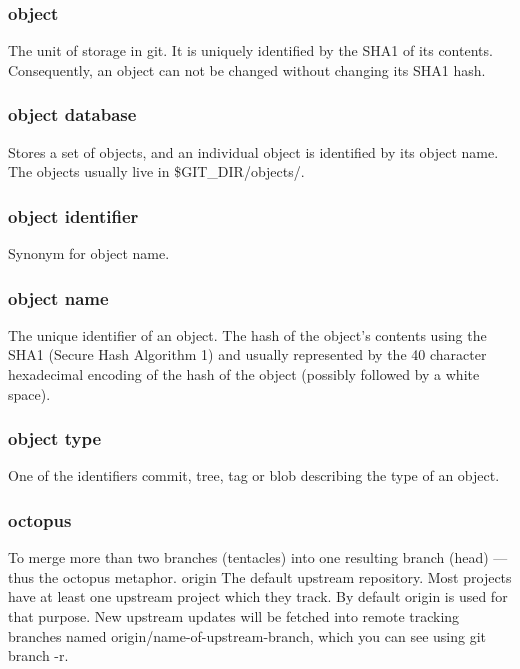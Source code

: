 \subsubsection{object}

The unit of storage in git. It is uniquely identified by the SHA1 of its contents. Consequently, an object can not be changed without changing its SHA1 hash.

\subsubsection{object database}

Stores a set of objects, and an individual object is identified by its object name. The objects usually live in \$GIT\_DIR/objects/.

\subsubsection{object identifier}

Synonym for object name.

\subsubsection{object name}

The unique identifier of an object. The hash of the object's contents using the SHA1 (Secure Hash Algorithm 1) and usually represented by the 40 character hexadecimal encoding of the hash of the object (possibly followed by a white space).

\subsubsection{object type}

One of the identifiers commit, tree, tag or blob describing the type of an object.

\subsubsection{octopus}

To merge more than two branches (tentacles) into one resulting branch (head) — thus the octopus metaphor.
origin
The default upstream repository. Most projects have at least one upstream project which they track. By default origin is used for that purpose. New upstream updates will be fetched into remote tracking branches named origin/name-of-upstream-branch, which you can see using git branch -r.

